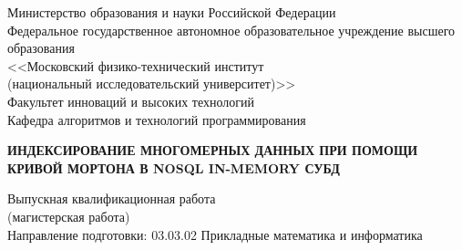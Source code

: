 \thispagestyle{empty}%
\begin{center}%
\small{Министерство образования и науки Российской Федерации}\\
Федеральное государственное автономное образовательное учреждение высшего\\
образования\\
<<Московский физико-технический институт\\
(национальный исследовательский университет)>>\\
\normalsize {Факультет инноваций и высоких технологий}\\
\small{Кафедра алгоритмов и технологий программирования}
\end{center}%
%
%
%
\vspace{0pt plus3fill} %
%
\vspace{0pt plus1fill} %
\begin{center}%
\textbf {\large \MakeUppercase{Индексирование многомерных данных при помощи кривой Мортона в NoSQL in-memory СУБД}}

\vspace{0pt plus1fill} %
{%
Выпускная квалификационная работа\\
(магистерская работа)\\
}
\vspace{0pt plus1fill}
{
Направление подготовки: 03.03.02 Прикладные математика и информатика
}

\end{center}%
